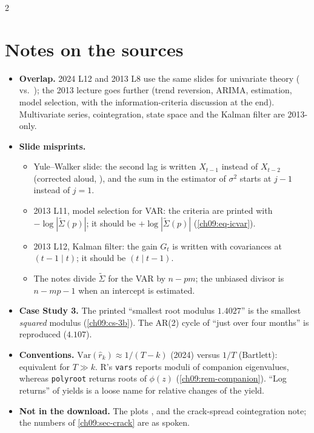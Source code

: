 \begin{paracol}{2}
\section{Notes on the sources}\label{ch09:sec-notes}

\begin{coursenote}
\begin{itemize}
  \item \textbf{Overlap.} 2024 L12 and 2013 L8 use the same slides for univariate theory ( vs.\ ); the 2013 lecture goes further (trend reversion, ARIMA,
        estimation, model selection, with the information-criteria discussion at the end). Multivariate series, cointegration, state space and the Kalman filter are 2013-only.
  \item \textbf{Slide misprints.}
  \begin{itemize}
    \item Yule--Walker slide: the second lag is written $X_{t-1}$ instead of $X_{t-2}$ (corrected aloud, ), and the sum in the estimator of $\sigma^2$
        starts at $j-1$ instead of $j=1$.
    \item 2013 L11, model selection for VAR: the criteria are printed with $-\log|\tilde\Sigma(p)|$; it should be $+\log|\tilde\Sigma(p)|$ (\cref{ch09:eq-icvar}).
    \item 2013 L12, Kalman filter: the gain $G_t$ is written with covariances at $(t-1\mid t)$; it should be $(t\mid t-1)$.
    \item The notes divide $\tilde\Sigma$ for the VAR by $n-pm$; the unbiased
        divisor is $n-mp-1$ when an intercept is estimated.
  \end{itemize}
  \item \textbf{Case Study 3.} The printed ``smallest root modulus $1.4027$'' is the smallest \emph{squared} modulus (\cref{ch09:cs-3b}). The AR(2) cycle of ``just over four months'' is
        reproduced ($4.107$).
  \item \textbf{Conventions.} $\mathrm{Var}(\hat r_k)\approx1/(T-k)$ (2024) versus $1/T$ (Bartlett): equivalent for $T\gg k$. R's \texttt{vars} reports moduli of companion eigenvalues, whereas
        \texttt{polyroot} returns roots of $\phi(z)$ (\cref{ch09:rem-companion}). ``Log returns'' of yields is a loose name for relative changes of the yield.
  \item \textbf{Not in the download.} The plots ,  and the crack-spread cointegration note; the numbers of \cref{ch09:sec-crack} are as spoken.
\end{itemize}
\end{coursenote}


\end{paracol}
